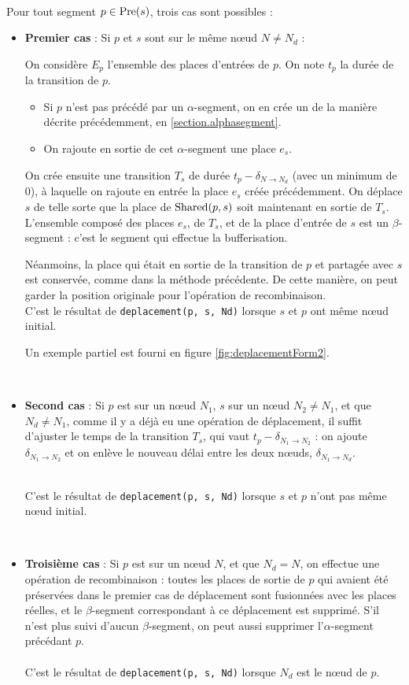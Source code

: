 ~ \\
Pour tout segment $p \in \operatorname{Pre}(s)$, trois cas sont possibles : 
\begin{itemize}
\item {\textbf{Premier cas} : Si $p$ et $s$ sont sur le même nœud $N \neq N_d$ :

On considère $E_{p}$ l'ensemble des places d'entrées de $p$.
On note $t_p$ la durée de la transition de $p$.

\begin{itemize}
\item Si $p$ n'est pas précédé par un $\alpha$-segment, on en crée un de la manière décrite précédemment, en \ref{section.alphasegment}.
\item On rajoute en sortie de cet $\alpha$-segment une place $e_s$.
\end{itemize}
\vspace{1em}

On crée ensuite une transition $T_s$ de durée $t_p - \delta_{N \rightarrow N_d}$ (avec un minimum de 0), à laquelle on rajoute en entrée la place $e_s$ créée précédemment. On déplace $s$ de telle sorte que la place de $\operatorname{Shared}(p, s)$ soit maintenant en sortie de $T_s$.
L'ensemble composé des places $e_s$, de $T_s$, et de la place d'entrée de $s$ est un $\beta$-segment : c'est le segment qui effectue la bufferisation.

Néanmoins, la place qui était en sortie de la transition de $p$ et partagée avec $s$ est conservée, comme dans la méthode précédente. De cette manière, on peut garder la position originale pour l'opération de recombinaison.
~ \\

C'est le résultat de \texttt{deplacement(p, s, Nd)} lorsque $s$ et $p$ ont même nœud initial.

Un exemple partiel est fourni en figure \ref{fig:deplacementForm2}.
}
\\
\item{\textbf{Second cas} : Si $p$ est sur un nœud $N_1$, $s$ sur un nœud $N_2 \neq N_1$, et que $N_d \neq N_1$, comme il y a déjà eu une opération de déplacement, il suffit d'ajuster le temps de la transition $T_s$, qui vaut $t_p - \delta_{N_1 \rightarrow N_2}$ : on ajoute $\delta_{N_1 \rightarrow N_2}$ et on enlève le nouveau délai entre les deux nœuds, $\delta_{N_1 \rightarrow N_d}$.

~ \\
C'est le résultat de \texttt{deplacement(p, s, Nd)} lorsque $s$ et $p$ n'ont pas même nœud initial.
}
\\
\item \textbf{Troisième cas} : Si $p$ est sur un nœud $N$, et que $N_d = N$, on effectue une opération de recombinaison : toutes les places de sortie de $p$ qui avaient été préservées dans le premier cas de déplacement sont fusionnées avec les places réelles, et le $\beta$-segment correspondant à ce déplacement est supprimé. S'il n'est plus suivi d'aucun $\beta$-segment, on peut aussi supprimer l'$\alpha$-segment précédant $p$.
~ \\
~ \\
C'est le résultat de \texttt{deplacement(p, s, Nd)} lorsque $N_d$ est le nœud de $p$.
\end{itemize}

